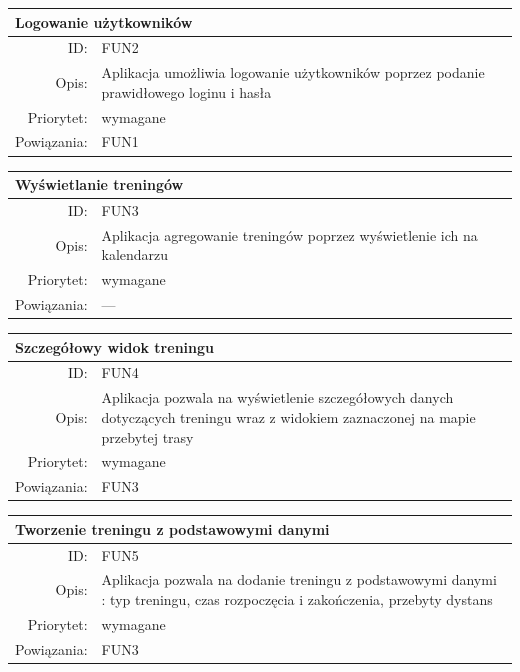 \begin{center}
      \begin{tabular}{rp{10cm}}
	      \multicolumn{2}{l}{\textbf{Logowanie użytkowników}} \\
	      \hline
	      ID: & FUN2 \\
	      Opis: & Aplikacja umożliwia logowanie użytkowników poprzez podanie prawidłowego loginu i hasła \\
	      Priorytet: & wymagane \\
	      Powiązania: & FUN1 \\
    \end{tabular}
\end{center}

\begin{center}
      \begin{tabular}{rp{10cm}}
	      \multicolumn{2}{l}{\textbf{Wyświetlanie treningów}} \\
	      \hline
	      ID: & FUN3 \\
	      Opis: & Aplikacja agregowanie treningów poprzez wyświetlenie ich na kalendarzu \\
	      Priorytet: & wymagane \\
	      Powiązania: & --- \\
    \end{tabular}
\end{center}

\begin{center}
      \begin{tabular}{rp{10cm}}
	      \multicolumn{2}{l}{\textbf{Szczegółowy widok treningu}} \\
	      \hline
	      ID: & FUN4 \\
	      Opis: & Aplikacja pozwala na wyświetlenie szczegółowych danych dotyczących treningu wraz z widokiem zaznaczonej na mapie przebytej trasy \\
	      Priorytet: & wymagane \\
	      Powiązania: & FUN3\\
    \end{tabular}
\end{center}

\begin{center}
      \begin{tabular}{rp{10cm}}
	      \multicolumn{2}{l}{\textbf{Tworzenie treningu z podstawowymi danymi}} \\
	      \hline
	      ID: & FUN5 \\
	      Opis: & Aplikacja pozwala na dodanie treningu z podstawowymi danymi : typ treningu, czas rozpoczęcia i zakończenia,	 przebyty dystans \\
	      Priorytet: & wymagane \\
	      Powiązania: & FUN3 \\
    \end{tabular}
\end{center}

